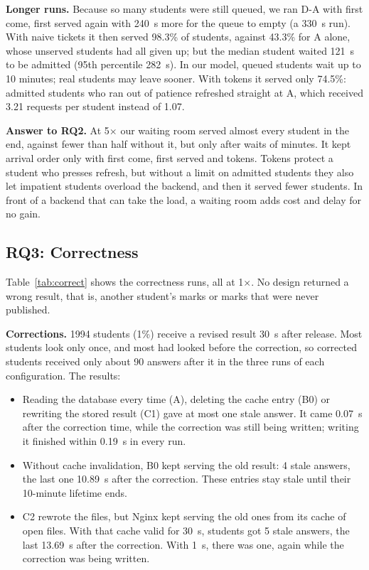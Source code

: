 \textbf{Longer runs.} Because so many students were still queued, we ran D-A
with first come, first served again with \SI{240}{s} more for the queue to
empty (a \SI{330}{s} run). With naive tickets it then served 98.3\% of
students, against 43.3\% for A alone, whose unserved students had all given
up; but the median student waited \SI{121}{s} to be admitted (95th percentile
\SI{282}{s}). In our model, queued students wait up to 10 minutes; real
students may leave sooner. With tokens it served only 74.5\%: admitted
students who ran out of patience refreshed straight at A, which received 3.21
requests per student instead of 1.07.

\textbf{Answer to RQ2.} At 5$\times$ our waiting room served almost every
student in the end, against fewer than half without it, but only after waits
of minutes. It kept arrival order only with first come, first served and
tokens. Tokens protect a student who presses refresh, but without a limit on
admitted students they also let impatient students overload the backend, and
then it served fewer students. In front of a backend that can take the load, a
waiting room adds cost and delay for no gain.

\subsection{RQ3: Correctness}
\label{sec:rq3}



Table~\ref{tab:correct} shows the correctness runs, all at 1$\times$. No design
returned a wrong result, that is, another student's marks or marks that were
never published.

\textbf{Corrections.} \num{1994} students (1\%) receive a revised result
\SI{30}{s} after release. Most students look only once, and most had looked
before the correction, so corrected students received only about 90 answers
after it in the three runs of each configuration. The results:
\begin{itemize}
\item Reading the database every time (A), deleting the cache entry (B0) or
rewriting the stored result (C1) gave at most one stale answer. It came
\SI{0.07}{s} after the correction time, while the correction was still being
written; writing it finished within \SI{0.19}{s} in every run.
\item Without cache invalidation, B0 kept serving the old result: 4 stale
answers, the last one \SI{10.89}{s} after the correction. These entries stay
stale until their 10-minute lifetime ends.
\item C2 rewrote the files, but Nginx kept serving the old ones from its cache
of open files. With that cache valid for \SI{30}{s}, students got 5 stale
answers, the last \SI{13.69}{s} after the correction. With \SI{1}{s}, there was
one, again while the correction was being written.
\end{itemize}

